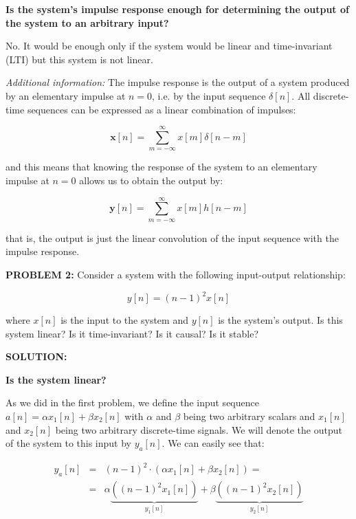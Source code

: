 \documentclass[11pt]{article}
\def\x{{\mathbf x}}
\def\x{{\mathbf x}}
\def\y{{\mathbf y}}
\begin{document}
\textbf{Is the system's impulse response enough for determining the output of the system to an arbitrary input?}

No. It would be enough only if the system would be linear and time-invariant (LTI) but this system is not linear. 

\emph{Additional information:} The impulse response is the output of a system produced by an elementary impulse at $n=0$, i.e. by the input sequence $\delta[n]$. All discrete-time sequences can be expressed as a linear combination of impulses:

\[
\x[n] = \sum_{m=-\infty}^{\infty} x[m]\delta[n-m]
\]

and this means that knowing the response of the system to an elementary impulse at $n=0$ allows us to obtain the output by:

\[
\y[n] = \sum_{m=-\infty}^{\infty} x[m]h[n-m]
\]

that is, the output is just the linear convolution of the input sequence with the impulse response.




\vspace{1cm}



\textbf{PROBLEM 2:} Consider a system with the following input-output relationship:

\[
y[n] = (n-1)^2 x[n]
\]

where $x[n]$ is the input to the system and $y[n]$ is the system's output. Is this system linear? Is it time-invariant? Is it causal? Is it stable?

\vspace{1cm}

\textbf{SOLUTION:}

\textbf{Is the system linear?}

As we did in the first problem, we define the input sequence $a[n]=\alpha x_1[n]+\beta x_2[n]$ with $\alpha$ and $\beta$ being two arbitrary scalars and $x_1[n]$ and $x_2[n]$ being two arbitrary discrete-time signals. We will denote the output of the system to this input by $y_a[n]$. We can easily see that:


\[
\begin{array}{lll}
y_a[n] &=& (n-1)^2 \cdot\left(\alpha x_1[n]+\beta x_2[n]\right)=\\
& = & \alpha \underbrace{\left((n-1)^2 x_1[n]\right)}_{y_1[n]}+ \beta \underbrace{\left((n-1)^2 x_2[n]\right)}_{y_2[n]}
\end{array}
\]
\end{document}
